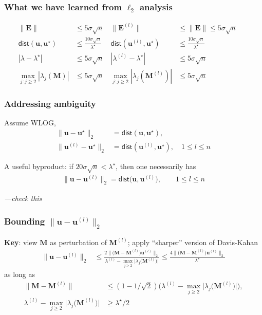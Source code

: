 \documentclass[compress,
mathserif,wide,%
]{beamer}
\begin{document}
\begin{frame}
	\frametitle{What we have learned from $\ell_2$ analysis}
	\begin{subequations}
\begin{align*}
  \|\bm{E} \|  &\leq 5\sigma \sqrt{n}    & \|\bm{E}^{(l)} \| &\leq \|\bm{E} \| \leq 5\sigma \sqrt{n}  && \\
  \mathsf{dist}( \bm{u} , \bm{u}^{\star} )  &\leq \frac{10\sigma\sqrt{n}}{\lambda^{\star}}  ~~
 & \mathsf{dist}( \bm{u}^{(l)} , \bm{u}^{\star} )  &\leq \frac{10\sigma\sqrt{n}}{\lambda^{\star}} && \\
	| \lambda - \lambda^{\star} |  &\leq 5\sigma \sqrt{n} & | \lambda^{(l)} - \lambda^{\star} |  &\leq 5\sigma \sqrt{n} &&\\
	\max_{j: j\geq 2} | \lambda_j(\bm{M})   |  &\leq 5\sigma \sqrt{n} & \max_{j: j\geq 2}| \lambda_j(\bm{M}^{(l)}) |  &\leq 5\sigma \sqrt{n}
\end{align*}
%
\end{subequations}
\end{frame}

\begin{frame}
	\frametitle{Addressing ambiguity}
	Assume WLOG, 
 \begin{subequations}
\begin{align*}
	\|\bm{u} - \bm{u}^{\star}\|_2 &= \mathsf{dist}( \bm{u}, \bm{u}^{\star} ), \quad \\
	\big\| \bm{u}^{(l)} - \bm{u}^{\star} \big\|_2 &= \mathsf{dist}( \bm{u}^{(l)}, \bm{u}^{\star} ) , \quad 1 \leq l \leq n
\end{align*}
\end{subequations}


A useful byproduct: if ${20\sigma{\sqrt{n}}} < \lambda^{\star}$, then one necessarily has
%
\begin{align*}
	\big\| \bm{u} -  \bm{u}^{(l)} \big\|_2 = \mathsf{dist}\big( \bm{u}, \bm{u}^{(l)}\big), \qquad 1 \leq l \leq n	
\end{align*}

{\hfill \em \footnotesize ---check this}
\end{frame}

\begin{frame}
	\frametitle{Bounding $\|\bm{u} - \bm{u}^{(l)}\|_{2}$}
	{\bf Key}: view $\bm{M}$ as perturbation of $\bm{M}^{(l)}$; apply ``sharper'' version of Davis-Kahan
\begin{align*}
	\big\|\bm{u}-\bm{u}^{(l)}\big\|_{2} &
	\leq\frac{2\|\big(\bm{M}-\bm{M}^{(l)}\big)\bm{u}^{(l)}\|_{2}}{\lambda^{(l)}- \max\limits_{j\geq 2}\big| \lambda_{j}\big(\bm{M}^{(l)}\big) \big| }
	\leq \frac{4\|\big(\bm{M}-\bm{M}^{(l)}\big)\bm{u}^{(l)}\|_{2}}{\lambda^{\star}}
\end{align*}
as long as 
\begin{align*}
\|\bm{M}-\bm{M}^{(l)}\| & \leq (1 - 1 / \sqrt{2}) \Big(\lambda^{(l)}-  \max_{j\geq 2}\big| \lambda_{j}\big(\bm{M}^{(l)}\big) \big| \Big), \\
\lambda^{(l)}-  \max_{j\geq 2}\big| \lambda_{j}\big(\bm{M}^{(l)}\big) \big| & \geq\lambda^{\star}/2 
\end{align*}

\end{frame}
\end{document}
